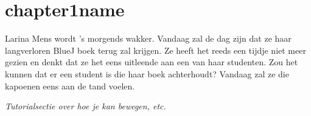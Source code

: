 \section{chapter1name}

Larina Mens wordt 's morgends wakker. Vandaag zal de dag zijn dat ze haar
langverloren BlueJ boek terug zal krijgen. Ze heeft het reeds een tijdje niet
meer gezien en denkt dat ze het eens uitleende aan een van haar studenten. Zou
het kunnen dat er een student is die haar boek achterhoudt? Vandaag zal ze die
kapoenen eens aan de tand voelen.

\textit{Tutorialsectie over hoe je kan bewegen, etc.}

